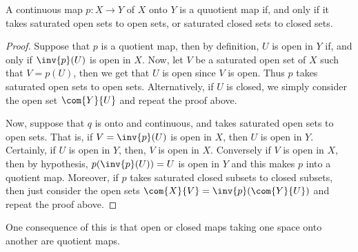 \begin{lemma}\label{2.4.2}
    A continuous map $p:X \rightarrow Y$ of $X$ onto  $Y$ is a quuotient map if,
    and only if it takes saturated open sets to open sets, or saturated closed
    sets to closed sets.
\end{lemma}
\begin{proof}
    Suppose that $p$ is a quotient map, then by definition, $U$ is open in $Y$
    if, and only if  $\inv{p}(U)$ is open in $X$. Now, let  $V$ be a saturated
    open set of  $X$ such that $V=p(U)$, then we get that $U$ is open since  $V$
    is open. Thus  $p$ takes saturated open sets to open sets. Alternatively,
    if  $U$ is closed, we simply consider the open set $\com{Y}{U}$ and repeat
    the proof above.

    Now, suppose that $q$ is onto and continuous, and takes saturated open sets
    to open sets. That is, if  $V=\inv{p}(U)$ is open in $X$, then  $U$ is open
    in $Y$. Certainly, if  $U$ is open in  $Y$, then, $V$ is open in  $X$.
    Conversely if  $V$ is open in  $X$, then by hypothesis, $p(\inv{p}(U))=U$ is
    open in  $Y$ and this makes  $p$ into a quotient map. Moreover, if  $p$
    takes saturated closed subsets to closed subsets, then just consider the
    open sets $\com{X}{V}=\inv{p}(\com{Y}{U})$ and repeat the proof above.
\end{proof}
\begin{remark}
    One consequence of this is that open or closed maps taking one space onto
    another are quotient maps.
\end{remark}

